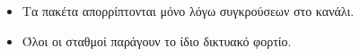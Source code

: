 \documentclass[12pt]{report}
\begin{document}
\begin{itemize}
	\item Τα πακέτα απορρίπτονται μόνο λόγω συγκρούσεων στο κανάλι.
	\item Όλοι οι σταθμοί παράγουν το ίδιο δικτυακό φορτίο.
\end{itemize}

\end{document}
